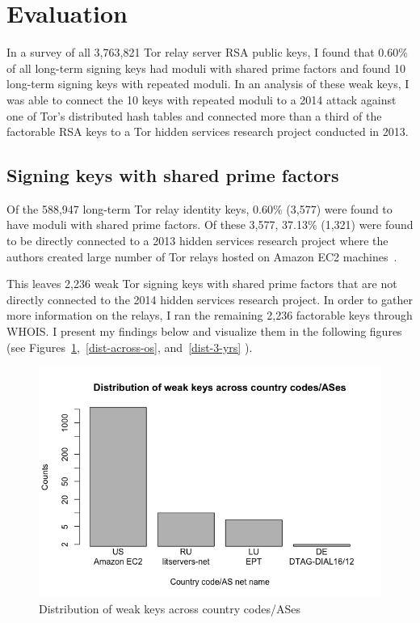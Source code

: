 \section{Evaluation}
\label{sec:eval}

In a survey of all 3,763,821 Tor relay server RSA public keys, I found that 0.60\% of all long-term signing keys had moduli with shared prime factors and found 10 long-term signing keys with repeated moduli. In an analysis of these weak keys, I was able to connect the 10 keys with repeated moduli to a 2014 attack against one of Tor's distributed hash tables and connected more than a third of the factorable RSA keys to a Tor hidden services research project conducted in 2013.

\subsection{Signing keys with shared prime factors}
Of the 588,947 long-term Tor relay identity keys, 0.60\% (3,577) were found to have moduli with shared prime factors. Of these 3,577, 37.13\% (1,321) were found to be directly connected to a 2013 hidden services research project where the authors created large number of Tor relays hosted on Amazon EC2 machines~\cite{biryukov2013trawling, sybil}.

This leaves 2,236 weak Tor signing keys with shared prime factors that are not directly connected to the 2014 hidden services research project. In order to gather more information on the relays, I ran the remaining 2,236 factorable keys through WHOIS. I present my findings below and visualize them in the following figures (see Figures~\ref{country-code-distro},~\ref{dist-across-os}, and~\ref{dist-3-yrs} ).

\begin{figure}[h]
\centering
\includegraphics[width=\linewidth]{country-code-distribution.png}
\caption{Distribution of weak keys across country codes/ASes}
\label{country-code-distro}
\end{figure}


